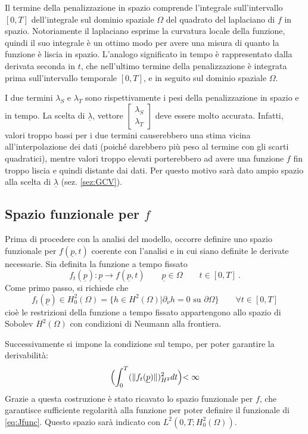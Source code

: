 \documentclass[a4paper,11pt,twoside,openright]{book}							%
\begin{document}
Il termine della penalizzazione in spazio comprende l'integrale sull'intervallo $[0,T]$ dell'integrale sul dominio spaziale $\Omega$ del quadrato del laplaciano di $f$ in spazio. Notoriamente il laplaciano esprime la curvatura locale della funzione, quindi il suo integrale è un ottimo modo per avere una misura di quanto la funzione è liscia in spazio. L'analogo significato in tempo è rappresentato dalla derivata seconda in $t$, che nell'ultimo termine della penalizzazione è integrata prima sull'intervallo temporale $[0,T]$, e in seguito sul dominio spaziale $\Omega$.

I due termini $\lambda_S$ e $\lambda_T$ sono rispettivamente i pesi della penalizzazione in spazio e in tempo. La scelta di $\underline \lambda$, vettore $ \begin{bmatrix}
\lambda_S \\ \lambda_T
\end{bmatrix}$ deve essere molto accurata. Infatti, valori troppo bassi per i due termini causerebbero una stima vicina all'interpolazione dei dati (poiché darebbero più peso al termine con gli scarti quadratici), mentre valori troppo elevati porterebbero ad avere una funzione $f$ fin troppo liscia e quindi distante dai dati. Per questo motivo sarà dato ampio spazio alla scelta di $\underline \lambda$ (sez. \ref{sez:GCV}).


\subsection*{Spazio funzionale per $f$}
Prima di procedere con la analisi del modello, occorre definire uno spazio funzionale per $f(\underline p, t)$ coerente con l'analisi e in cui siano definite le derivate necessarie. Sia definita la funzione a tempo fissato
$$
f_t(\underline p) : \underline p \rightarrow f(\underline p,t ) \qquad \underline p \in \Omega \qquad t \in [0,T] \ .
$$
Come primo passo, si richiede che 
$$
f_t(\underline p) \in H^2_{0}(\Omega) = \{h \in H^2(\Omega) | \partial _{\nu}h=0 \mbox{ su } \partial \Omega\} \qquad \forall t \in [0,T]
$$
cioè le restrizioni della funzione a tempo fissato appartengono allo spazio di Sobolev $H^2(\Omega)$ con condizioni di Neumann alla frontiera.

Successivamente si impone la condizione sul tempo, per poter garantire la derivabilità:
$$
\Bigl( \int_{0}^T (\|f_t(\underline p) \|)_{H^2}^2 dt \Bigl) < \infty
$$
Grazie a questa costruzione è stato ricavato lo spazio funzionale per $f$, che garantisce sufficiente regolarità alla funzione per poter definire il funzionale di \ref{eq:Jfunc}. Questo spazio sarà indicato con $L^2(0,T;H^2_{0}(\Omega))$.
\end{document}
